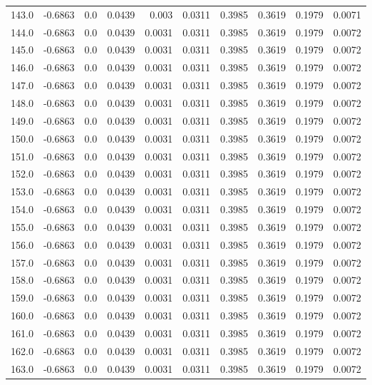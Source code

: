 \begin{longtable}{lrrrrrrrrr}
143.0 & -0.6863 & 0.0 & 0.0439 & 0.003 & 0.0311 & 0.3985 & 0.3619 & 0.1979 & 0.0071 \\
144.0 & -0.6863 & 0.0 & 0.0439 & 0.0031 & 0.0311 & 0.3985 & 0.3619 & 0.1979 & 0.0072 \\
145.0 & -0.6863 & 0.0 & 0.0439 & 0.0031 & 0.0311 & 0.3985 & 0.3619 & 0.1979 & 0.0072 \\
146.0 & -0.6863 & 0.0 & 0.0439 & 0.0031 & 0.0311 & 0.3985 & 0.3619 & 0.1979 & 0.0072 \\
147.0 & -0.6863 & 0.0 & 0.0439 & 0.0031 & 0.0311 & 0.3985 & 0.3619 & 0.1979 & 0.0072 \\
148.0 & -0.6863 & 0.0 & 0.0439 & 0.0031 & 0.0311 & 0.3985 & 0.3619 & 0.1979 & 0.0072 \\
149.0 & -0.6863 & 0.0 & 0.0439 & 0.0031 & 0.0311 & 0.3985 & 0.3619 & 0.1979 & 0.0072 \\
150.0 & -0.6863 & 0.0 & 0.0439 & 0.0031 & 0.0311 & 0.3985 & 0.3619 & 0.1979 & 0.0072 \\
151.0 & -0.6863 & 0.0 & 0.0439 & 0.0031 & 0.0311 & 0.3985 & 0.3619 & 0.1979 & 0.0072 \\
152.0 & -0.6863 & 0.0 & 0.0439 & 0.0031 & 0.0311 & 0.3985 & 0.3619 & 0.1979 & 0.0072 \\
153.0 & -0.6863 & 0.0 & 0.0439 & 0.0031 & 0.0311 & 0.3985 & 0.3619 & 0.1979 & 0.0072 \\
154.0 & -0.6863 & 0.0 & 0.0439 & 0.0031 & 0.0311 & 0.3985 & 0.3619 & 0.1979 & 0.0072 \\
155.0 & -0.6863 & 0.0 & 0.0439 & 0.0031 & 0.0311 & 0.3985 & 0.3619 & 0.1979 & 0.0072 \\
156.0 & -0.6863 & 0.0 & 0.0439 & 0.0031 & 0.0311 & 0.3985 & 0.3619 & 0.1979 & 0.0072 \\
157.0 & -0.6863 & 0.0 & 0.0439 & 0.0031 & 0.0311 & 0.3985 & 0.3619 & 0.1979 & 0.0072 \\
158.0 & -0.6863 & 0.0 & 0.0439 & 0.0031 & 0.0311 & 0.3985 & 0.3619 & 0.1979 & 0.0072 \\
159.0 & -0.6863 & 0.0 & 0.0439 & 0.0031 & 0.0311 & 0.3985 & 0.3619 & 0.1979 & 0.0072 \\
160.0 & -0.6863 & 0.0 & 0.0439 & 0.0031 & 0.0311 & 0.3985 & 0.3619 & 0.1979 & 0.0072 \\
161.0 & -0.6863 & 0.0 & 0.0439 & 0.0031 & 0.0311 & 0.3985 & 0.3619 & 0.1979 & 0.0072 \\
162.0 & -0.6863 & 0.0 & 0.0439 & 0.0031 & 0.0311 & 0.3985 & 0.3619 & 0.1979 & 0.0072 \\
163.0 & -0.6863 & 0.0 & 0.0439 & 0.0031 & 0.0311 & 0.3985 & 0.3619 & 0.1979 & 0.0072 \\

\end{longtable}
